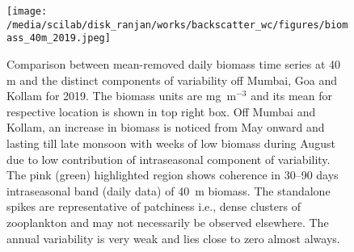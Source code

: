 \documentclass{article}
\begin{document}
\begin{figure}[htbp]
	\centering
	\texttt{[image: /media/scilab/disk\_ranjan/works/backscatter\_wc/figures/biomass\_40m\_2019.jpeg]} 
	\captionsetup{justification=justified,font=footnotesize,skip=0.05\baselineskip,width=\textwidth}
	\caption{Comparison between mean-removed daily biomass time series at 40 m and the distinct components of variability off Mumbai, Goa and Kollam for 2019. The biomass units are mg~m$^{-3}$ and its mean for respective location is shown in top right box. Off Mumbai and Kollam, an increase in biomass is noticed from May onward and lasting till late monsoon with weeks of low biomass during August due to low contribution of intraseasonal component of variability. The pink (green) highlighted region shows coherence in 30--90 days intraseasonal band (daily data) of 40~m biomass. The standalone spikes are representative of patchiness i.e., dense clusters of zooplankton and may not necessarily be observed elsewhere. The annual variability is very weak and lies close to zero almost always.}
	\label{fig:variability}
\end{figure}
\end{document}
